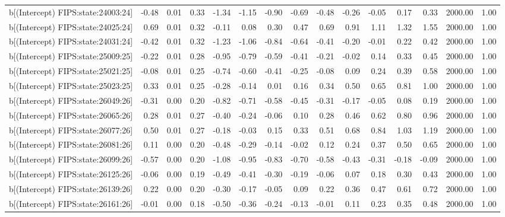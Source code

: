 \begin{table}[ht]
\begin{tabular}{rrrrrrrrrrrrrrr}
  b[(Intercept) FIPS:state:24003:24] & -0.48 & 0.01 & 0.33 & -1.34 & -1.15 & -0.90 & -0.69 & -0.48 & -0.26 & -0.05 & 0.17 & 0.33 & 2000.00 & 1.00 \\ 
  b[(Intercept) FIPS:state:24025:24] & 0.69 & 0.01 & 0.32 & -0.11 & 0.08 & 0.30 & 0.47 & 0.69 & 0.91 & 1.11 & 1.32 & 1.55 & 2000.00 & 1.00 \\ 
  b[(Intercept) FIPS:state:24031:24] & -0.42 & 0.01 & 0.32 & -1.23 & -1.06 & -0.84 & -0.64 & -0.41 & -0.20 & -0.01 & 0.22 & 0.42 & 2000.00 & 1.00 \\ 
  b[(Intercept) FIPS:state:25009:25] & -0.22 & 0.01 & 0.28 & -0.95 & -0.79 & -0.59 & -0.41 & -0.21 & -0.02 & 0.14 & 0.33 & 0.45 & 2000.00 & 1.00 \\ 
  b[(Intercept) FIPS:state:25021:25] & -0.08 & 0.01 & 0.25 & -0.74 & -0.60 & -0.41 & -0.25 & -0.08 & 0.09 & 0.24 & 0.39 & 0.58 & 2000.00 & 1.00 \\ 
  b[(Intercept) FIPS:state:25023:25] & 0.33 & 0.01 & 0.25 & -0.28 & -0.14 & 0.01 & 0.16 & 0.34 & 0.50 & 0.65 & 0.81 & 1.00 & 2000.00 & 1.00 \\ 
  b[(Intercept) FIPS:state:26049:26] & -0.31 & 0.00 & 0.20 & -0.82 & -0.71 & -0.58 & -0.45 & -0.31 & -0.17 & -0.05 & 0.08 & 0.19 & 2000.00 & 1.00 \\ 
  b[(Intercept) FIPS:state:26065:26] & 0.28 & 0.01 & 0.27 & -0.40 & -0.24 & -0.06 & 0.10 & 0.28 & 0.46 & 0.62 & 0.80 & 0.96 & 2000.00 & 1.00 \\ 
  b[(Intercept) FIPS:state:26077:26] & 0.50 & 0.01 & 0.27 & -0.18 & -0.03 & 0.15 & 0.33 & 0.51 & 0.68 & 0.84 & 1.03 & 1.19 & 2000.00 & 1.00 \\ 
  b[(Intercept) FIPS:state:26081:26] & 0.11 & 0.00 & 0.20 & -0.48 & -0.29 & -0.14 & -0.02 & 0.12 & 0.24 & 0.37 & 0.50 & 0.65 & 2000.00 & 1.00 \\ 
  b[(Intercept) FIPS:state:26099:26] & -0.57 & 0.00 & 0.20 & -1.08 & -0.95 & -0.83 & -0.70 & -0.58 & -0.43 & -0.31 & -0.18 & -0.09 & 2000.00 & 1.00 \\ 
  b[(Intercept) FIPS:state:26125:26] & -0.06 & 0.00 & 0.19 & -0.49 & -0.41 & -0.30 & -0.19 & -0.06 & 0.07 & 0.18 & 0.30 & 0.43 & 2000.00 & 1.00 \\ 
  b[(Intercept) FIPS:state:26139:26] & 0.22 & 0.00 & 0.20 & -0.30 & -0.17 & -0.05 & 0.09 & 0.22 & 0.36 & 0.47 & 0.61 & 0.72 & 2000.00 & 1.00 \\ 
  b[(Intercept) FIPS:state:26161:26] & -0.01 & 0.00 & 0.18 & -0.50 & -0.36 & -0.24 & -0.13 & -0.01 & 0.11 & 0.23 & 0.35 & 0.48 & 2000.00 & 1.00 \\ 

\end{tabular}
\end{table}
